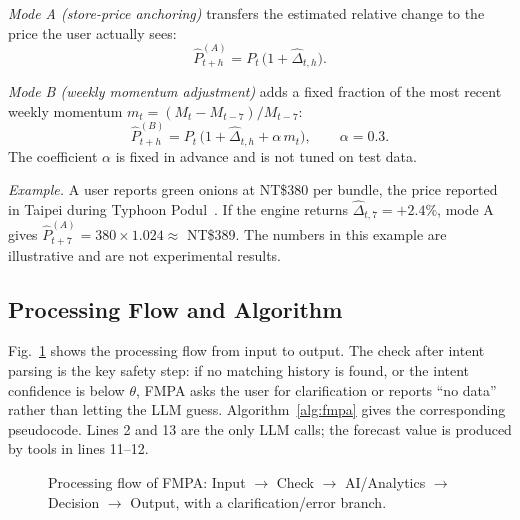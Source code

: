 \textit{Mode A (store-price anchoring)} transfers the estimated relative change
to the price the user actually sees:
\begin{equation}
\hat{P}^{(A)}_{t+h}=P_t\,\bigl(1+\hat{\Delta}_{t,h}\bigr).
\label{eq:modeA}
\end{equation}

\textit{Mode B (weekly momentum adjustment)} adds a fixed fraction of the most
recent weekly momentum $m_t=(M_t-M_{t-7})/M_{t-7}$:
\begin{equation}
\hat{P}^{(B)}_{t+h}=P_t\,\bigl(1+\hat{\Delta}_{t,h}+\alpha\, m_t\bigr),
\qquad \alpha=0.3 .
\label{eq:modeB}
\end{equation}
The coefficient $\alpha$ is fixed in advance and is not tuned on test data.



\textit{Example.} A user reports green onions at NT\$380 per bundle, the
price reported in Taipei during Typhoon Podul~\cite{pts2025onion}. If the
engine returns $\hat{\Delta}_{t,7}=+2.4\%$, mode A gives
$\hat{P}^{(A)}_{t+7}=380\times1.024\approx$ NT\$389. The numbers in this
example are illustrative and are not experimental results.

\subsection{Processing Flow and Algorithm}
Fig.~\ref{fig:flowchart} shows the processing flow from input to output. The
check after intent parsing is the key safety step: if no matching history is
found, or the intent confidence is below $\theta$, FMPA asks the user for
clarification or reports ``no data'' rather than letting the LLM guess.
Algorithm~\ref{alg:fmpa} gives the corresponding pseudocode. Lines 2 and 13
are the only LLM calls; the forecast value is produced by tools in lines
11--12.

\begin{figure}[t]
\centering

\caption{Processing flow of FMPA: Input $\rightarrow$ Check $\rightarrow$
AI/Analytics $\rightarrow$ Decision $\rightarrow$ Output, with a
clarification/error branch.}
\label{fig:flowchart}
\end{figure}

